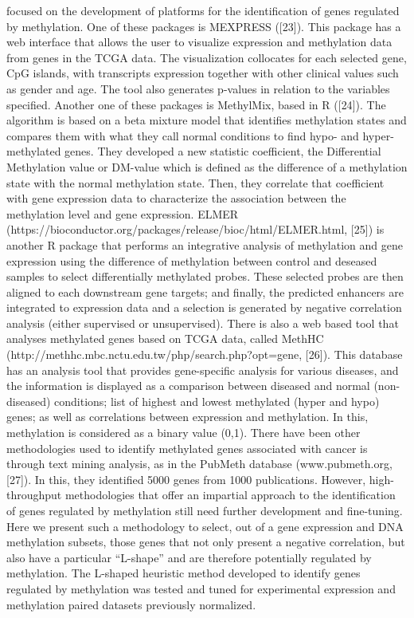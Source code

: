\documentclass[10pt,letterpaper]{article}
\begin{document}
focused on the development of platforms for the identification of genes
regulated by methylation. One of these packages is MEXPRESS ({[}23{]}).
This package has a web interface that allows the user to visualize
expression and methylation data from genes in the TCGA data. The
visualization collocates for each selected gene, CpG islands, with
transcripts expression together with other clinical values such as
gender and age. The tool also generates p-values in relation to the
variables specified. Another one of these packages is MethylMix, based
in R ({[}24{]}). The algorithm is based on a beta mixture model that
identifies methylation states and compares them with what they call
normal conditions to find hypo- and hyper-methylated genes. They
developed a new statistic coefficient, the Differential Methylation
value or DM-value which is defined as the difference of a methylation
state with the normal methylation state. Then, they correlate that
coefficient with gene expression data to characterize the association
between the methylation level and gene expression. ELMER
(https://bioconductor.org/packages/release/bioc/html/ELMER.html,
{[}25{]}) is another R package that performs an integrative analysis of
methylation and gene expression using the difference of methylation
between control and deseased samples to select differentially methylated
probes. These selected probes are then aligned to each downstream gene
targets; and finally, the predicted enhancers are integrated to
expression data and a selection is generated by negative correlation
analysis (either supervised or unsupervised). There is also a web based
tool that analyses methylated genes based on TCGA data, called MethHC
(http://methhc.mbc.nctu.edu.tw/php/search.php?opt=gene, {[}26{]}). This
database has an analysis tool that provides gene-specific analysis for
various diseases, and the information is displayed as a comparison
between diseased and normal (non-diseased) conditions; list of highest
and lowest methylated (hyper and hypo) genes; as well as correlations
between expression and methylation. In this, methylation is considered
as a binary value (0,1). There have been other methodologies used to
identify methylated genes associated with cancer is through text mining
analysis, as in the PubMeth database (www.pubmeth.org, {[}27{]}). In
this, they identified 5000 genes from 1000 publications. However,
high-throughput methodologies that offer an impartial approach to the
identification of genes regulated by methylation still need further
development and fine-tuning. Here we present such a methodology to
select, out of a gene expression and DNA methylation subsets, those
genes that not only present a negative correlation, but also have a
particular ``L-shape'' and are therefore potentially regulated by
methylation. The L-shaped heuristic method developed to identify genes
regulated by methylation was tested and tuned for experimental
expression and methylation paired datasets previously normalized.
\end{document}
